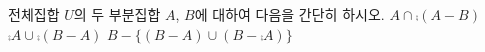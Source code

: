 전체집합 $U$의 두 부분집합 $A$, $B$에 대하여 다음을 간단히 하시오.
 $A\cap\comp{(A-B)}$
 $\comp{A}\cup\comp{(B-A)}$
 $B-\{(B-A)\cup(B-\comp{A})\}$
